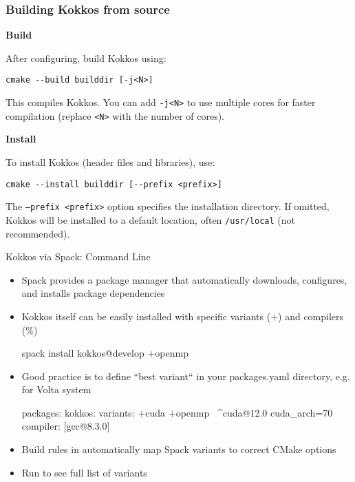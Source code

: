\begin{frame}[fragile]
\frametitle{Building Kokkos from source}
\textbf{Build}

After configuring, build Kokkos using:
\begin{verbatim}
cmake --build builddir [-j<N>]
\end{verbatim}

This compiles Kokkos. You can add \texttt{-j<N>} to use multiple cores for faster compilation (replace \texttt{<N>} with the number of cores).

\vspace{1eM}
\textbf{Install}

To install Kokkos (header files and libraries), use:
\begin{verbatim}
cmake --install builddir [--prefix <prefix>]
\end{verbatim}

The \texttt{--prefix <prefix>} option specifies the installation directory. If omitted, Kokkos will be installed to a default location, often \texttt{/usr/local} (not recommended).

\end{frame}


\begin{frame}[fragile]{Kokkos via Spack: Command Line}
\begin{itemize}
\item Spack provides a package manager that automatically downloads, configures, and installs package dependencies
\item Kokkos itself can be easily installed with specific variants (+) and compilers (\%)
\begin{shell}
spack install kokkos@develop +openmp %
\end{shell}
\item Good practice is to define ``best variant`` in your packages.yaml directory, e.g. for Volta system
\begin{shell}
packages:
   kokkos:
    variants: +cuda +openmp \
              ^cuda@12.0 cuda_arch=70
    compiler: [gcc@8.3.0]
\end{shell}
\item Build rules in  automatically map Spack variants to correct CMake options
\item Run \inlineshell{spack info kokkos} to see full list of variants
\end{itemize}
\end{frame}


